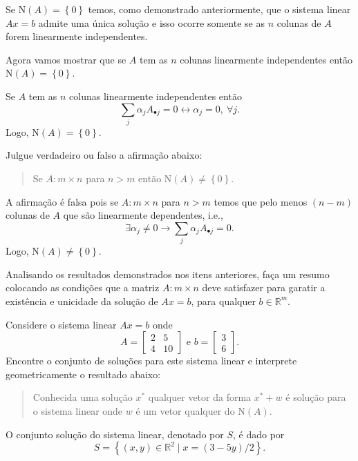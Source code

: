 \documentclass[a4paper,12pt, leqno, answers]{exam}
\newcommand{\mdot}{\bullet}
\newcommand{\EN}{\text{N}}
\begin{document}
\begin{questions}
\begin{solution}
        Se $\EN (A) = \left\{ 0 \right\}$ temos, como demonstrado anteriormente, que o sistema linear $A x = b$ admite uma \'{u}nica solu\c{c}\~{a}o e isso ocorre somente se as $n$ colunas de $A$ forem linearmente independentes.

        Agora vamos mostrar que se $A$ tem as $n$ colunas linearmente independentes ent\~{a}o $\EN (A) = \left\{ 0 \right\}$.

        Se $A$ tem as $n$ colunas linearmente independentes ent\~{a}o
        \[
        \sum_j \alpha_j A_{\mdot j} = 0 \leftrightarrow \alpha_j = 0, \  \forall j.
        \]
        Logo, $\EN (A) = \left\{ 0 \right\}$.
    \end{solution}

    \question Julgue verdadeiro ou falso a afirma\c{c}\~{a}o abaixo:
    \begin{quote}
        Se $A: m \times n$ para $n > m$ ent\~{a}o $\EN (A) \neq \left\{ 0 \right\}$.
    \end{quote}
    \begin{solution}
        A afirma\c{c}\~{a}o \'{e} falsa pois se $A: m \times n$ para $n > m$ temos que pelo menos $\left( n - m \right)$ colunas de $A$ que s\~{a}o linearmente dependentes, i.e.,
        \[
        \exists \alpha_j \neq 0 \rightarrow \sum_j \alpha_j A_{\mdot j} = 0.
        \]
        Logo, $\EN (A) \neq \left\{ 0 \right\}$.
    \end{solution}

    \question Analisando os resultados demonstrados nos itens anteriores, fa\c{c}a um resumo colocando as condi\c{c}\~{o}es que a matriz $A: m \times n$ deve satisfazer para garatir a exist\^{e}ncia e unicidade da solu\c{c}\~{a}o de $A x = b$, para qualquer $b \in \mathbb{R}^m$.
    \begin{solution}
        
    \end{solution}

    \question Considere o sistema linear $A x = b$ onde
    \[
    A = \begin{bmatrix}
        2 & 5 \\
        4 & 10
    \end{bmatrix} \text{ e } b = \begin{bmatrix}
        3 \\
        6
    \end{bmatrix}.
    \]
    Encontre o conjunto de solu\c{c}\~{o}es para este sistema linear e interprete geometricamente o resultado abaixo:
    \begin{quote}
        Conhecida uma solu\c{c}\~{a}o $x^*$ qualquer vetor da forma $x^* + w$ \'{e} solu\c{c}\~{a}o para o sistema linear onde $w$ \'{e} um vetor qualquer do $\EN (A)$.
    \end{quote}
    \begin{solution}
        O conjunto solu\c{c}\~{a}o do sistema linear, denotado por $S$, \'{e} dado por
        \[
        S = \left\{ (x, y) \in \mathbb{R}^2 \mid x = \left( 3 - 5 y \right) / 2 \right\}.
        \]


\end{solution}
\end{questions}
\end{document}
